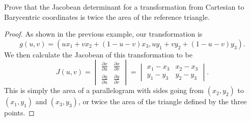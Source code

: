 \begin{example}
    Prove that the Jacobean determinant for a transformation from Cartesian to Barycentric coordinates is twice the area of the reference triangle.

    \begin{proof}
        As shown in the previous example, our transformation is
        \[g(u, v) = (ux_{1} + vx_{2} + (1 - u - v)x_{3}, uy_{1} + vy_{2} + (1 - u - v)y_{3}).\]
        We then calculate the Jacobean of this transformation to be
        \[J(u, v) = \begin{vmatrix}
            \frac{\partial x}{\partial u} & \frac{\partial x}{\partial v} \\
            \frac{\partial y}{\partial u} & \frac{\partial y}{\partial v}
        \end{vmatrix} = \begin{vmatrix}
            x_{1} - x_{3} & x_{2} - x_{3} \\
            y_{1} - y_{3} & y_{2} - y_{3}
        \end{vmatrix}.\]
        This is simply the area of a parallelogram with sides going from $(x_{2}, y_{2})$ to $(x_{1}, y_{1})$ and $(x_{3}, y_{3})$, or twice the area of the triangle defined by the three points.
    \end{proof}
\end{example}